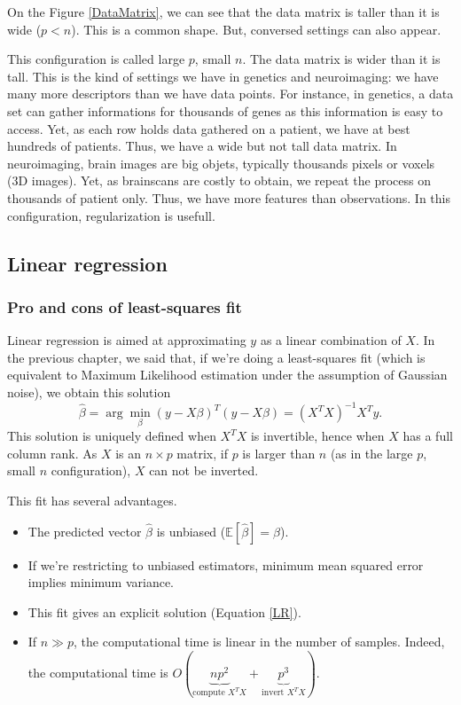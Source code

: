 \documentclass[a4paper,12pt]{article}
\begin{document}
On the Figure \ref{DataMatrix}, we can see that the data matrix is taller than it is wide ($p < n$). This is a  common shape. But, conversed settings can also appear. 

This configuration is called large $p$, small $n$. The data matrix is wider than it is tall. This is the kind of settings we have in genetics and neuroimaging: we have many more descriptors than we have data points. For instance, in genetics, a data set can gather informations for thousands of genes as this information is easy to access. Yet, as each row holds data gathered on a patient, we have at best hundreds of patients. Thus, we have a wide but not tall data matrix. In neuroimaging, brain images are big objets, typically thousands pixels or voxels (3D images). Yet, as brainscans are costly to obtain, we repeat the process on thousands of patient only. Thus, we have more features than observations. In this configuration, regularization is usefull.

\subsection{Linear regression}
\subsubsection{Pro and cons of least-squares fit}
Linear regression is aimed at approximating $y$ as a linear combination of $X$. In the previous chapter, we said that, if we're doing a least-squares fit (which is equivalent to Maximum Likelihood estimation under the assumption of Gaussian noise), we obtain this solution
\begin{equation}
\hat{\beta} = \arg\min_{\beta} (y-X\beta)^{T} (y-X\beta) = (X^T X)^{-1} X^T y.
\label{LR}
\end{equation}
This solution is uniquely defined when $X^T X$ is invertible, hence when $X$ has a full column rank. As $X$ is an $n \times p$ matrix, if $p$ is larger than $n$ (as in the large $p$, small $n$ configuration), $X$ can not be inverted.

This fit has several advantages.
\begin{itemize}
\item The predicted vector $\hat{\beta}$ is unbiased ($\mathbb{E}[\hat{\beta}]= \beta$).
\item If we're restricting to unbiased estimators, minimum mean squared error implies minimum variance.
\item This fit gives an explicit solution (Equation \ref{LR}).
\item If $n \gg p$, the computational time is linear in the number of samples. Indeed, the computational time is $O(\underbrace{np^2}_{\text{compute } X^T X}+\underbrace{p^3}_{\text{invert } X^T X})$. 
\end{itemize}
\end{document}

